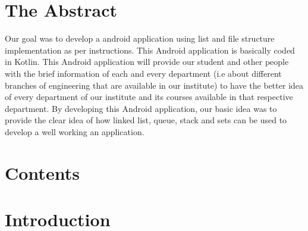 \documentclass[11pt,a4paper]{report}
\begin{document}
		\section*{\Large{The Abstract}}
		
		Our goal was to develop a android application using list and file structure implementation as per instructions. This Android application is basically coded in Kotlin. This Android application will provide our student and other people with the brief information of each and every department (i.e about different branches of engineering that are available in our institute) to have the better idea of every department of our institute and its courses available in that respective department. By developing this Android application, our basic idea was to provide the clear idea of how linked list, queue, stack and sets can be used to develop a well working an application.
		\vskip 25cm
		\section*{\Large{Contents}}
	\centering
		\vfill
		\pagebreak
		\section*{\Large{Introduction}}
	
\end{document}

